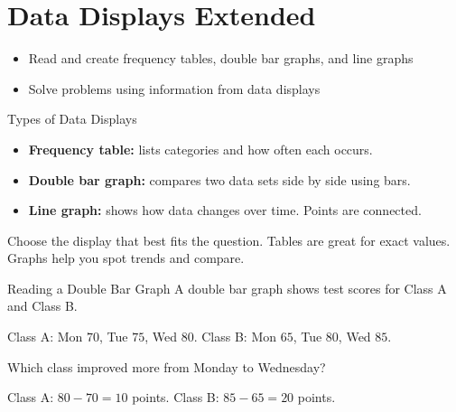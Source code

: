 \section{Data Displays Extended}

\begin{learningGoals}
\begin{itemize}
    \item Read and create frequency tables, double bar graphs, and line graphs
    \item Solve problems using information from data displays
\end{itemize}
\end{learningGoals}

\begin{conceptBox}{Types of Data Displays}
\begin{itemize}[leftmargin=*]
    \item \textbf{Frequency table:} lists categories and how often each occurs.
    \item \textbf{Double bar graph:} compares two data sets side by side using bars.
    \item \textbf{Line graph:} shows how data changes over time. Points are connected.
\end{itemize}
Choose the display that best fits the question. Tables are great for exact values. Graphs help you spot trends and compare.
\end{conceptBox}

\begin{workedExample}{Reading a Double Bar Graph}
A double bar graph shows test scores for Class A and Class B.

Class A: Mon $70$, Tue $75$, Wed $80$. \quad Class B: Mon $65$, Tue $80$, Wed $85$.

Which class improved more from Monday to Wednesday?

Class A: $80 - 70 = 10$ points. \quad Class B: $85 - 65 = 20$ points.
\end{workedExample}


